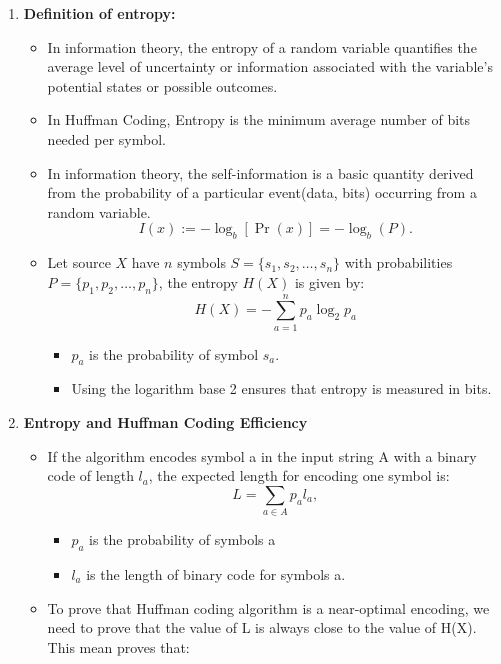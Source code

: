     \begin{enumerate}[label=\textbf{\Alph*.}]
        \item \textbf{Definition of entropy:}
        \begin{itemize}
            \item In information theory, the entropy of a random variable quantifies the average level of uncertainty or information associated with the variable's potential states or possible outcomes.\cite{WikipediaEntropy}
            \item In Huffman Coding, Entropy is the minimum average number of bits needed per symbol.
            \item In information theory, the self-information is a basic quantity derived from the probability of a particular event(data, bits) occurring from a random variable.\cite{wikipedia_information_content}
            \[
                I(x) := -\log_b [\Pr(x)] = -\log_b (P).
            \]
            \item Let source \( X \) have \( n \) symbols \( S = \{s_1, s_2, \dots, s_n\} \) with probabilities \( P = \{p_1, p_2, \dots, p_n\} \), the entropy \( H(X) \) is given by:
            \[
                H(X) = -\sum_{a=1}^{n} p_a \log_2 p_a
            \]
            \begin{itemize}
                \item $p_a$ is the probability of symbol $s_a$.
                \item Using the logarithm base 2  ensures that entropy is measured in bits.
            \end{itemize}
        \end{itemize}
        \item \textbf{Entropy and Huffman Coding Efficiency}
        \begin{itemize}
            \item If the algorithm encodes symbol a in the input string A with a binary code of length $l_a$, the expected length for encoding one symbol is:
            \[
                L = \sum_{a \in A} p_a l_a,
            \]
            \begin{itemize}
                \item $p_a$ is the probability of symbols a
                \item $l_a$ is the length of binary code for symbols a.
            \end{itemize}
            \item To prove that Huffman coding algorithm is a near-optimal encoding, we need to prove that the value of L is always close to the value of H(X). This mean proves that:

\end{itemize}
\end{enumerate}

